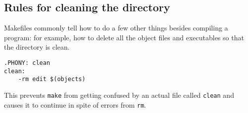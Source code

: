 \subsection{Rules for cleaning the directory}
Makefiles commonly tell how to do a few other things besides compiling a program: for example, how to delete all the object files and executables so that the directory is clean. 
\begin{verbatim}
.PHONY: clean
clean:
    -rm edit $(objects)
\end{verbatim}
This prevents \texttt{make} from getting confused by an actual file called \texttt{clean} and causes it to continue in spite of errors from \texttt{rm}.

%
